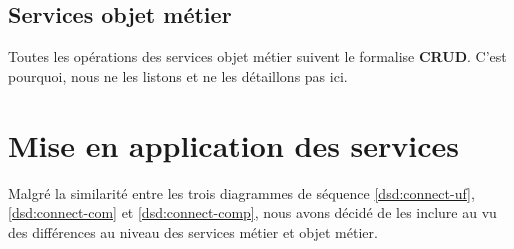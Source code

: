 
\subsection{Services objet métier}
Toutes les opérations des services objet métier suivent le formalise
\textbf{CRUD}. C'est pourquoi, nous ne les listons et ne les détaillons pas
ici. \\

\section{Mise en application des services}
Malgré la similarité entre les trois diagrammes de séquence
\ref{dsd:connect-uf}, \ref{dsd:connect-com} et \ref{dsd:connect-comp}, nous
avons décidé de les inclure au vu des différences au niveau des services métier
et objet métier.

